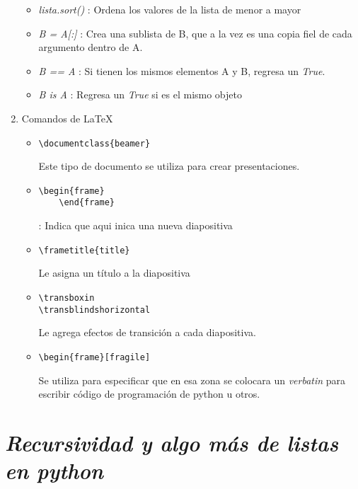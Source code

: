 \documentclass{book}
\begin{document}
\begin{enumerate}
\begin{itemize}
		\item \textit{lista.sort()} : Ordena los valores de la lista de menor a mayor
		\item \textit{B = A[:]} : Crea una sublista de B, que a la vez es una copia fiel de cada argumento dentro de A.
		\item \textit{B == A} : Si tienen los mismos elementos A y B, regresa un \textit{True}.
		\item \textit{B is A} : Regresa un \textit{True} si es el mismo objeto
		
	\end{itemize}
	
	
	\item Comandos de \LaTeX
	\begin{itemize}
		\item \begin{lstlisting}
\documentclass{beamer}
		\end{lstlisting} Este tipo de documento se utiliza para crear presentaciones.
		\item \begin{lstlisting}
\begin{frame}
    \end{frame}
		\end{lstlisting} : Indica que aqui inica una nueva diapositiva
		\item \begin{lstlisting}
\frametitle{title}
		\end{lstlisting} Le asigna un título a la diapositiva
		\item \begin{lstlisting}
\transboxin
\transblindshorizontal
		\end{lstlisting} Le agrega efectos de transición a cada diapositiva.
		\item \begin{lstlisting}
\begin{frame}[fragile]
		\end{lstlisting} Se utiliza para especificar que en esa zona se colocara un \textit{verbatin} para escribir código de programación de python u otros.
		
		
		
	\end{itemize}
	
\end{enumerate}



	\section{\textit{Recursividad y algo más de listas en python }}
	
\end{document}
